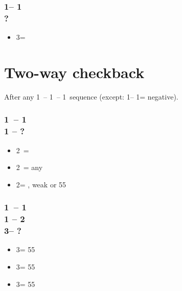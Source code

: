 \documentclass[12pt, a4paper]{report}
\begin{document}
{{{            \subsubsection*{1\diams -- 1\spades\\
                            ?}
            \begin{itemize}
                \item 3\hearts = \diams\ \gf
            \end{itemize}
        }

        \section*{\colorbox{blue!30}{Two-way checkback}}
         {

            After any 1\ -- 1\ -- 1\ sequence (except:
            1\clubs -- 1\diams = negative).

            \subsubsection*{1\ -- 1 \\ 1 -- ?}
            \begin{itemize}
                \item 2\clubs\ = \diams
                \item 2\diams\ = any \gf
                \item 2\nt = \clubs, weak or 55
            \end{itemize}

            \subsubsection*{1\ -- 1 \\ 
                            1 -- 2\nt\\
                            3\clubs -- ?}
            \begin{itemize}
                \item 3\diams = 55\diams
                \item 3\hearts = 55\hearts
                \item 3\spades = 55\clubs
            \end{itemize}
        }

}}
\end{document}
